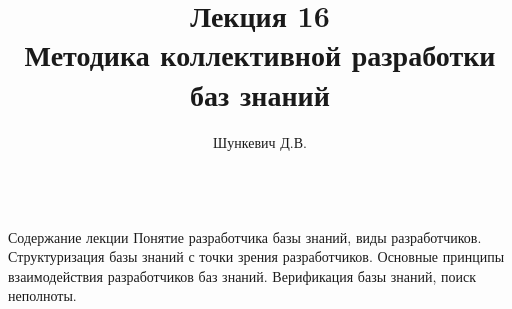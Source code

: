 \title{Лекция 16\\Методика коллективной разработки баз знаний}
\author[]{Шункевич Д.В.}

\begin{frame}
	\titlepage
\end{frame}

\begin{frame}{\\Содержание лекции}
	\topline
	\justifying
	Понятие разработчика базы знаний, виды разработчиков. Структуризация базы знаний с точки зрения разработчиков. Основные принципы взаимодействия разработчиков баз знаний. Верификация базы знаний, поиск неполноты.
\end{frame}